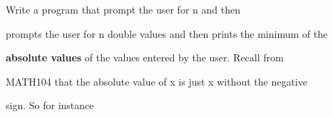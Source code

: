  Write a program that prompt the user for n and then

prompts the user for n double values and then prints the minimum of the

\textbf{absolute values} of the values entered by the user. Recall from

MATH104 that the absolute value of x is just x without the negative

sign. So for instance

